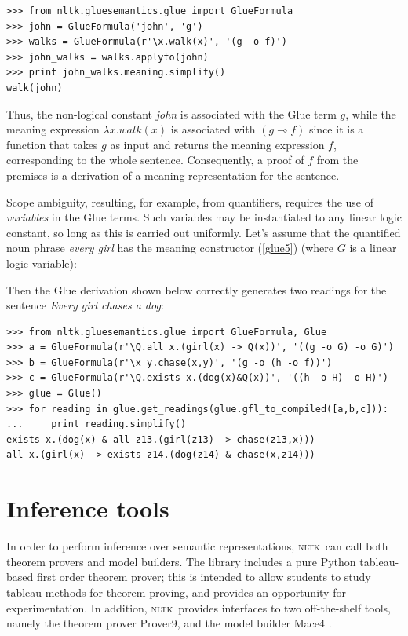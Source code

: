 \documentclass[11pt, a4paper]{article}
\newcommand{\NLTK}{\textsc{nltk}}
\begin{document}
\begin{Verbatim}
>>> from nltk.gluesemantics.glue import GlueFormula
>>> john = GlueFormula('john', 'g')
>>> walks = GlueFormula(r'\x.walk(x)', '(g -o f)')
>>> john_walks = walks.applyto(john)
>>> print john_walks.meaning.simplify()
walk(john)
\end{Verbatim}
Thus, the non-logical constant \textit{john} is associated with the
Glue term $g$, while the meaning expression $\lambda x.walk(x)$ is
associated with $(g \multimap f)$ since it is a function that
takes $g$ as input and returns the meaning expression $f$,
corresponding to the whole
sentence.  Consequently, a proof of $f$ from the premises is a derivation
of a meaning representation for the sentence.

Scope ambiguity, resulting, for example, from quantifiers, requires the
use of \textit{variables} in the Glue terms. Such variables may be
instantiated to any linear logic constant, so long as this is carried
out uniformly. Let's assume that the quantified noun phrase
\textit{every girl} has the meaning constructor (\ref{glue5}) (where
$G$ is a linear logic variable):

Then the Glue derivation shown below correctly
generates two readings for the sentence \textit{Every girl chases a dog}:
\begin{Verbatim}
>>> from nltk.gluesemantics.glue import GlueFormula, Glue
>>> a = GlueFormula(r'\Q.all x.(girl(x) -> Q(x))', '((g -o G) -o G)')
>>> b = GlueFormula(r'\x y.chase(x,y)', '(g -o (h -o f))')
>>> c = GlueFormula(r'\Q.exists x.(dog(x)&Q(x))', '((h -o H) -o H)')
>>> glue = Glue()
>>> for reading in glue.get_readings(glue.gfl_to_compiled([a,b,c])):
...     print reading.simplify()
exists x.(dog(x) & all z13.(girl(z13) -> chase(z13,x)))
all x.(girl(x) -> exists z14.(dog(z14) & chase(x,z14)))
\end{Verbatim}


\section{Inference tools}
In order to perform inference over semantic representations, \NLTK\
can call both theorem provers and model builders.
The library includes a pure Python tableau-based first order theorem prover;
this is intended to allow students to study 
tableau methods for theorem proving, and provides an
opportunity for experimentation.  In addition, \NLTK\ provides
interfaces to two off-the-shelf tools, namely the theorem prover Prover9, 
and the model builder Mace4  \citep{McCune}.  %
\end{document}
